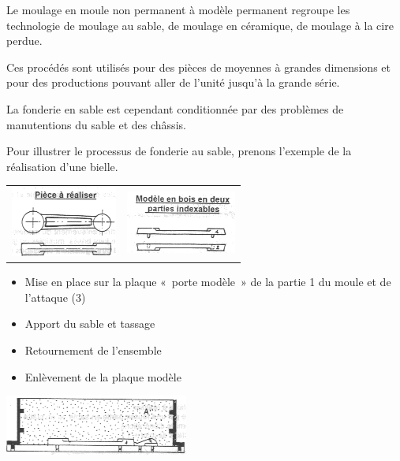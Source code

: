 \documentclass[11pt,oneside]{article}
\begin{document}
Le moulage en moule non permanent à modèle permanent regroupe les technologie
de moulage au sable, de moulage en céramique, de moulage à la cire perdue. 

Ces procédés sont utilisés pour des pièces de moyennes à grandes dimensions et
pour des productions pouvant aller de l'unité jusqu'à la grande série. 

La fonderie en sable est cependant conditionnée par des problèmes de
manutentions du sable et des châssis. 

Pour illustrer le processus de fonderie au sable, prenons l'exemple de la
réalisation d'une bielle.

\begin{center}
\begin{tabular}{cc}
 \includegraphics[width=.3\textwidth]{png/moulage1}&
 \includegraphics[width=.3\textwidth]{png/moulage2}
\end{tabular}
\end{center}


 
\begin{multicols}{2}
\begin{itemize}
 \item Mise en place sur la plaque «~porte modèle~» de la partie 1 du moule et
de l'attaque (3)
\item Apport du sable et tassage
\item Retournement de l'ensemble
\item Enlèvement de la plaque modèle
\end{itemize}

\begin{center}
 \includegraphics[width=.3\textwidth]{png/moulage3}
\end{center}
\end{multicols}
\end{document}
